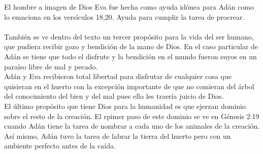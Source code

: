 \begin{section}{El hombre a imagen de Dios}
	Eva fue hecha como ayuda idónea para Adán como lo emnciona en los versículos 18,20. Ayuda para cumplir la tarea de procrear.\\
	\\
	También se ve dentro del texto un tercer propósito para la vida del ser humano, que pudiera recibir gozo y bendición de la mano de Dios. En el caso particular de Adán se tiene que todo el disfrute y la bendición en el mundo fueron suyos en un paraíso libre de mal y pecado.\\
	Adán y Eva recibieron total libertad para disfrutar de cualquier cosa que quisieran en el huerto con la excepción importante de que no comieran del árbol del conocimiento del bien y del mal pues ello les traería juicio de Dios.\\
	El último propósito que tiene Dios para la humanidad es que ejerzan dominio sobre el resto de la creación. El rpimer paso de este dominio se ve en Génesis 2:19 cuando Adán tiene la tarea de nombrar a cada uno de los animales de la creación. Así mismo, Adán tuvo la tarea de labrar la tierra del huerto pero con un ambiente perfecto antes de la caída.
\end{section}
\newpage
